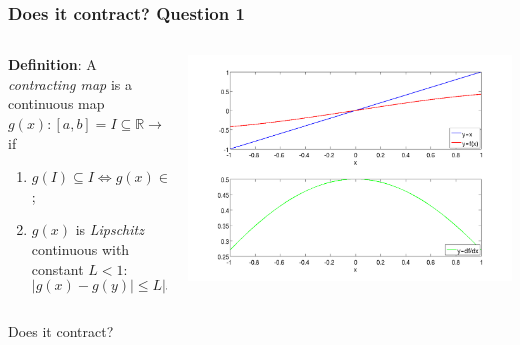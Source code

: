 \documentclass{beamer}
\begin{document}
\begin{frame}
\frametitle{Does it contract? Question 1}

\begin{columns}
    \begin{column}{0.45\textwidth}
  {\bf Definition}: A \emph{contracting map} is a continuous map
  $g(x) : [a, b] = I \subseteq \mathbb{R} \rightarrow \mathbb{R}$ if
\begin{enumerate}
  \item $g(I) \subseteq I \Leftrightarrow g(x) \in I \, \, \, \forall
    x \in I$;
  \item $g(x)$ is \emph{Lipschitz} continuous with constant $L < 1$:
    \begin{equation*}
      | g(x) - g(y) | \leq L | x - y | \, \, \, \forall x, y \in I.
    \end{equation*}
  \end{enumerate}
\end{column}
\begin{column}{0.55\textwidth}
  \begin{center}
   \includegraphics[width=\textwidth]{figures/cmap1}
  \end{center}
\end{column}
\end{columns}
\begin{overlayarea}{\textwidth}{0.1\textheight}
Does it contract?
\end{overlayarea}
\end{frame}
\end{document}
